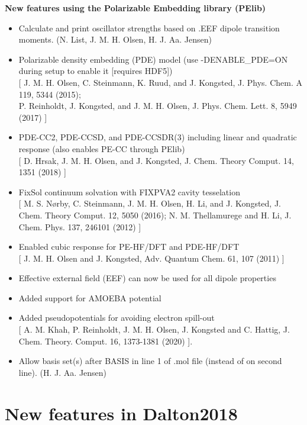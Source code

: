 \begin{description}
\item{\bf  New features using the Polarizable Embedding library (PElib)}
   \begin{itemize}
  \item Calculate and print oscillator strengths based on .EEF dipole transition moments. (N. List, J. M. H. Olsen, H. J. Aa. Jensen)
  \item Polarizable density embedding (PDE) model (use -DENABLE\_PDE=ON during setup to enable it [requires HDF5]) \\ {}
    [ J. M. H. Olsen, C. Steinmann, K. Ruud, and J. Kongsted, J. Phys. Chem. A 119, 5344 (2015); \\
      P. Reinholdt, J. Kongsted, and J. M. H. Olsen, J. Phys. Chem. Lett. 8, 5949 (2017) ]
  \item PDE-CC2, PDE-CCSD, and PDE-CCSDR(3) including linear and quadratic response (also enables PE-CC through PElib) \\ {}
    [ D. Hrsak, J. M. H. Olsen, and J. Kongsted, J. Chem. Theory Comput. 14, 1351 (2018) ]
  \item FixSol continuum solvation with FIXPVA2 cavity tesselation \\ {}
    [ M. S. Nørby, C. Steinmann, J. M. H. Olsen, H. Li, and J. Kongsted, J. Chem. Theory Comput. 12, 5050 (2016);
      N. M. Thellamurege and H. Li, J. Chem. Phys. 137, 246101 (2012) ]
  \item Enabled cubic response for PE-HF/DFT and PDE-HF/DFT \\ {}
    [ J. M. H. Olsen and J. Kongsted, Adv. Quantum Chem. 61, 107 (2011) ]
  \item Effective external field (EEF) can now be used for all dipole properties
  \item Added support for AMOEBA potential
  \item Added pseudopotentials for avoiding electron spill-out \\ {}
    [ A. M. Khah, P. Reinholdt, J. M. H. Olsen, J. Kongsted and C. Hattig, J. Chem. Theory. Comput. 16, 1373-1381 (2020) ].
  \item  Allow basis set(s) after BASIS in line 1 of .mol file (instead of on second line). (H. J. Aa. Jensen)
   \end{itemize}
\end{description}

\section{New features in Dalton2018}

